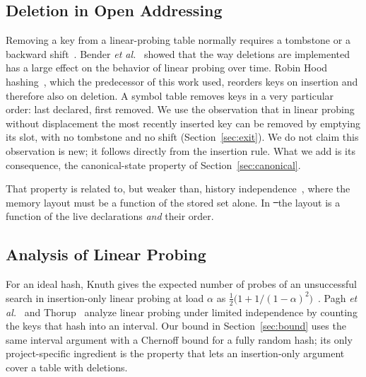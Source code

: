 \subsection{Deletion in Open Addressing}
Removing a key from a linear-probing table normally requires a tombstone or a backward shift~\cite{knuth3}. Bender \emph{et al.}~\cite{bender2021} showed that the way deletions are implemented has a large effect on the behavior of linear probing over time. Robin Hood hashing~\cite{celis1985}, which the predecessor of this work used, reorders keys on insertion and therefore also on deletion. A symbol table removes keys in a very particular order: last declared, first removed. We use the observation that in linear probing without displacement the most recently inserted key can be removed by emptying its slot, with no tombstone and no shift (Section~\ref{sec:exit}). We do not claim this observation is new; it follows directly from the insertion rule. What we add is its consequence, the canonical-state property of Section~\ref{sec:canonical}.

That property is related to, but weaker than, history independence~\cite{naor2001,blelloch2007}, where the memory layout must be a function of the stored set alone. In \st\ the layout is a function of the live declarations \emph{and} their order.

\subsection{Analysis of Linear Probing}
For an ideal hash, Knuth gives the expected number of probes of an unsuccessful search in insertion-only linear probing at load $\alpha$ as $\tfrac12\bigl(1+1/(1-\alpha)^2\bigr)$~\cite{knuth3}. Pagh \emph{et al.}~\cite{pagh2007} and Thorup~\cite{thorup2015} analyze linear probing under limited independence by counting the keys that hash into an interval. Our bound in Section~\ref{sec:bound} uses the same interval argument with a Chernoff bound for a fully random hash; its only project-specific ingredient is the property that lets an insertion-only argument cover a table with deletions.

